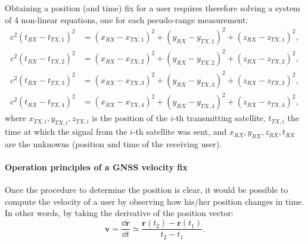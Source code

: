 %
Obtaining a position (and time) fix for a user requires therefore solving a 
system of 4 non-linear equations, one for each pseudo-range measurement:
%
\begin{align}
c^2(t_{RX} - t_{TX,1})^2 &= 
(x_{RX} - x_{TX,1})^2 + (y_{RX} - y_{TX,1})^2 + (z_{RX} - z_{TX,1})^2,
\\
c^2(t_{RX} - t_{TX,2})^2 &= 
(x_{RX} - x_{TX,2})^2 + (y_{RX} - y_{TX,2})^2 + (z_{RX} - z_{TX,2})^2,
\\
c^2(t_{RX} - t_{TX,3})^2 &= 
(x_{RX} - x_{TX,3})^2 + (y_{RX} - y_{TX,3})^2 + (z_{RX} - z_{TX,3})^2,
\\
c^2(t_{RX} - t_{TX,4})^2 &= 
(x_{RX} - x_{TX,4})^2 + (y_{RX} - y_{TX,4})^2 + (z_{RX} - z_{TX,4})^2,
\end{align}
%
where $x_{TX,i},y_{TX,i},z_{TX,i}$ is the position of the $i$-th transmitting
satellite, $t_{TX,i}$ the time at which the signal from the $i$-th satellite
was sent, and $x_{RX},y_{RX},z_{RX},t_{RX}$ are the unknowns (position and 
time of the receiving user).

\paragraph{Operation principles of a GNSS velocity fix}

Once the procedure to determine the position is clear, it would be possible to
compute the velocity of a user by observing how his/her position changes in
time. In other words, by taking the derivative of the position vector:
%
\begin{equation}
\bm v = \frac{\dd \bm r}{\dd t} \simeq \frac{\bm r(t_2)-\bm r(t_1)}{t_2-t_1}. 
\end{equation}
%

